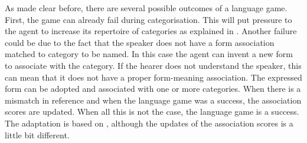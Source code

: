 As made clear before, there are several possible outcomes of a language game. First, the game can already fail during categorisation. This will put pressure to the agent to increase its repertoire of categories as explained in . Another failure could be due to the fact that the speaker does not have a form association matched to category to be named. In this case the agent can invent a new form to associate with the category. If the hearer does not understand the speaker, this can mean that it does not have a proper form-meaning association. The expressed form can be adopted and associated with one or more categories. When there is a mismatch in reference and when the language game was a success, the association scores are updated. When all this is not the case, the language game is a success. The adaptation is based on \citep{steels:1996a}, although the updates of the association scores is a little bit different.

